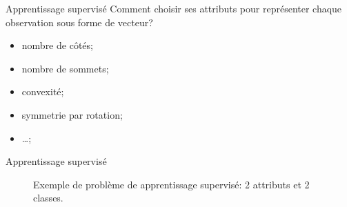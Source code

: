 \documentclass[8pt]{beamer}
\begin{document}
			\begin{frame}{Apprentissage supervisé}
				Comment choisir ses attributs pour représenter chaque observation sous forme de vecteur?
				\begin{itemize}
					\item<2-> nombre de côtés;
					\item<3-> nombre de sommets;
					\item<4-> convexité;
					\item<5-> symmetrie par rotation;
					\item<6-> \dots;
				\end{itemize}
			\end{frame}

			\begin{frame}{Apprentissage supervisé}
				\begin{figure}[H]
					\begin{center}
						
						\caption*{\tiny Exemple de problème de apprentissage supervisé: 2 attributs et 2 classes.}
					\end{center}
				\end{figure}
			\end{frame}
\end{document}
